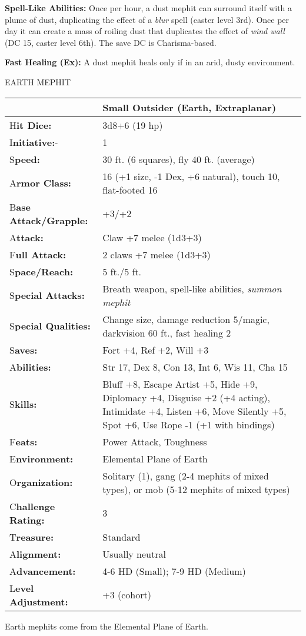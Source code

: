 \documentclass{article}
\begin{document}
\textbf{Spell-Like Abilities: }Once per hour, a dust mephit can surround itself 
with a plume of dust, duplicating the effect of a \textit{blur }spell (caster level 
3rd). Once per day it can create a mass of roiling dust that duplicates the effect 
of \textit{wind wall }(DC 15, caster level 6th). The save DC is Charisma-based.

\textbf{Fast Healing (Ex):} A dust mephit heals only if in an arid, dusty environment.

\vspace{12pt}
EARTH MEPHIT

\begin{tabular}{|>{\raggedright}p{90pt}|>{\raggedright}p{236pt}|}
\hline
  & Small Outsider (Earth, Extraplanar)\tabularnewline
\hline
H\textbf{it Dice:} & 3d8+6 (19 hp)\tabularnewline
\hline
I\textbf{nitiative:}- & 1\tabularnewline
\hline
S\textbf{peed:} & 30 ft. (6 squares), fly 40 ft. (average)\tabularnewline
\hline
A\textbf{rmor Class:} & 16 (+1 size, -1 Dex, +6 natural), touch 10, flat-footed 
16\tabularnewline
\hline
B\textbf{ase Attack/Grapple:} & +3/+2\tabularnewline
\hline
A\textbf{ttack:} & Claw +7 melee (1d3+3)\tabularnewline
\hline
F\textbf{ull Attack:} & 2 claws +7 melee (1d3+3)\tabularnewline
\hline
S\textbf{pace/Reach:} & 5 ft./5 ft.\tabularnewline
\hline
S\textbf{pecial Attacks:} & Breath weapon, spell-like abilities, \textit{summon 
mephit}\tabularnewline
\hline
S\textbf{pecial Qualities:} & Change size, damage reduction 5/magic, darkvision 
60 ft., fast healing 2\tabularnewline
\hline
S\textbf{aves:} & Fort +4, Ref +2, Will +3\tabularnewline
\hline
A\textbf{bilities:} & Str 17, Dex 8, Con 13, Int 6, Wis 11, Cha 15\tabularnewline
\hline
S\textbf{kills:} & Bluff +8, Escape Artist +5, Hide +9, Diplomacy +4, Disguise 
+2 (+4 acting), Intimidate +4, Listen +6, Move Silently +5, Spot +6, Use Rope -1 
(+1 with bindings)\tabularnewline
\hline
F\textbf{eats:} & Power Attack, Toughness\tabularnewline
\hline
E\textbf{nvironment:} & Elemental Plane of Earth\tabularnewline
\hline
O\textbf{rganization:} & Solitary (1), gang (2-4 mephits of mixed types), or mob 
(5-12 mephits of mixed types)\tabularnewline
\hline
C\textbf{hallenge Rating:} & 3\tabularnewline
\hline
T\textbf{reasure:} & Standard\tabularnewline
\hline
A\textbf{lignment:} & Usually neutral\tabularnewline
\hline
A\textbf{dvancement:} & 4-6 HD (Small); 7-9 HD (Medium)\tabularnewline
\hline
L\textbf{evel Adjustment:} & +3 (cohort)\tabularnewline
\hline
\end{tabular}

Earth mephits come from the Elemental Plane of Earth.
\end{document}
